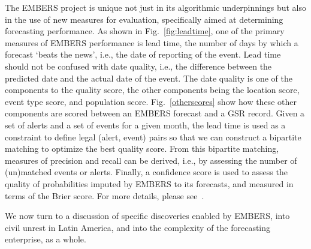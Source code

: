 The EMBERS project is unique not just in its algorithmic underpinnings but also in the use of new measures
for evaluation, specifically aimed at determining forecasting performance. As shown in Fig.~\ref{fig:leadtime},
one of the primary measures of EMBERS performance is lead time, the number of days by which a forecast
`beats the news', i.e., the date of reporting of the event. Lead time should not be confused with
date quality, i.e., the difference between the predicted date and the actual date of the event. The date
quality is one of the components to the quality score, the other components being the
location score, event type score, and population score. Fig.~\ref{otherscores} show how these other
components are scored between an EMBERS forecast and a GSR record. Given a set of alerts and a set of
events for a given month, the lead time is used as a constraint to define legal (alert, event) pairs so that
we can construct a bipartite matching to optimize the best quality score. From this bipartite matching,
measures of precision and recall can be derived, i.e., by assessing the number of (un)matched events or
alerts. Finally, a confidence score is used to assess the quality of probabilities imputed by EMBERS to its
forecasts, and measured in terms of the Brier score. For more details, please
see~\cite{kdd:beating-the-news}.

We now turn to a discussion of specific discoveries enabled by EMBERS, into civil unrest in Latin America, and into
the complexity of the forecasting enterprise, as a whole.


